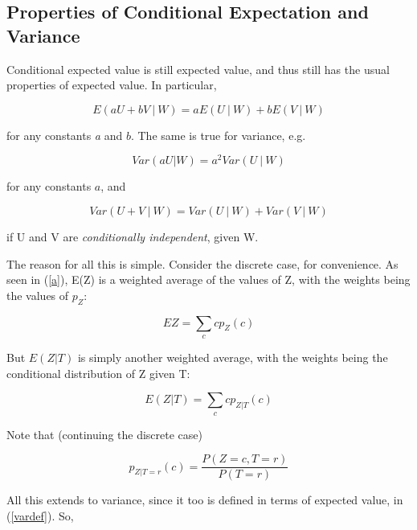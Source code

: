 
\subsection{Properties of Conditional Expectation and Variance}

Conditional expected value is still expected value, and thus still has
the usual properties of expected value.  In particular,

\begin{equation}
E(aU + bV ~|~ W) = a E(U ~|~ W) + b E(V ~|~ W)
\end{equation}

for any constants {\it a} and $b$.  The same is true for variance, e.g.

\begin{equation}
Var(aU | W) = a^2 Var(U ~|~ W)
\end{equation}

for any constants $a$, and 

\begin{equation}
Var(U + V ~|~ W) = Var(U ~|~ W) + Var(V ~|~ W)
\end{equation}

if U and V are {\it conditionally independent}, given W.

The reason for all this is simple.  Consider the discrete case, for
convenience.  As seen in (\ref{a}), E(Z) is a weighted average of the
values of Z, with the weights being the values of $p_Z$:

\begin{equation}
EZ = \sum_c c p_Z(c)
\end{equation}

But $E(Z | T)$ is simply another weighted average, with the weights
being the conditional distribution of Z given T:

\begin{equation}
E(Z | T) = \sum_c c p_{Z|T}(c)
\end{equation}

Note that (continuing the discrete case)

\begin{equation}
p_{Z|T=r}(c) =
\frac{P(Z = c, T = r)}{P(T = r)}
\end{equation}

All this extends to variance, since it too is defined in terms of
expected value, in (\ref{vardef}).  So,

